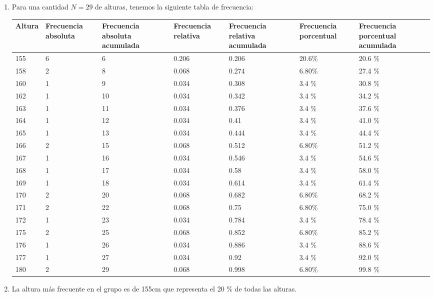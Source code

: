 \begin{solution}
    \begin{enumerate}
        \item Para una cantidad $N = 29$ de alturas, tenemos la siguiente tabla de frecuencia:
        \begin{table}[H]
            \centering
            \begin{tabular}{|p{1cm}|p{1.8cm}|p{2cm}|p{1.8cm}|p{2cm}|p{2cm}|p{2cm}|}
                \hline
                Altura & Frecuencia absoluta & Frecuencia absoluta acumulada & Frecuencia relativa & Frecuencia relativa acumulada & Frecuencia porcentual & Frecuencia porcentual acumulada\\
                \hline\hline
                155 & 6 &  6 & 0.206 & 0.206 & 20.6\% & 20.6 \% \\\hline
                158 & 2 &  8 & 0.068 & 0.274 & 6.80\% & 27.4 \% \\\hline
                160 & 1 &  9 & 0.034 & 0.308 & 3.4 \% & 30.8 \% \\\hline
                162 & 1 & 10 & 0.034 & 0.342 & 3.4 \% & 34.2 \% \\\hline
                163 & 1 & 11 & 0.034 & 0.376 & 3.4 \% & 37.6 \% \\\hline
                164 & 1 & 12 & 0.034 & 0.41  & 3.4 \% & 41.0 \% \\\hline
                165 & 1 & 13 & 0.034 & 0.444 & 3.4 \% & 44.4 \% \\\hline
                166 & 2 & 15 & 0.068 & 0.512 & 6.80\% & 51.2 \% \\\hline
                167 & 1 & 16 & 0.034 & 0.546 & 3.4 \% & 54.6 \% \\\hline
                168 & 1 & 17 & 0.034 & 0.58  & 3.4 \% & 58.0 \% \\\hline
                169 & 1 & 18 & 0.034 & 0.614 & 3.4 \% & 61.4 \% \\\hline
                170 & 2 & 20 & 0.068 & 0.682 & 6.80\% & 68.2 \% \\\hline
                171 & 2 & 22 & 0.068 & 0.75  & 6.80\% & 75.0 \% \\\hline
                172 & 1 & 23 & 0.034 & 0.784 & 3.4 \% & 78.4 \% \\\hline
                175 & 2 & 25 & 0.068 & 0.852 & 6.80\% & 85.2 \% \\\hline
                176 & 1 & 26 & 0.034 & 0.886 & 3.4 \% & 88.6 \% \\\hline
                177 & 1 & 27 & 0.034 & 0.92  & 3.4 \% & 92.0 \% \\\hline
                180 & 2 & 29 & 0.068 & 0.998 & 6.80\% & 99.8 \% \\\hline
            \end{tabular}
        \end{table}
        \item La altura más frecuente en el grupo es de 155cm que representa el 20 \% de todas las alturas. \qedhere
    \end{enumerate}
\end{solution}

